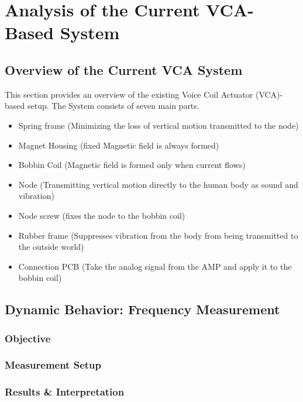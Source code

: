 \chapter{Analysis of the Current VCA-Based System}

\section{Overview of the Current VCA System}
This section provides an overview of the existing Voice Coil Actuator (VCA)-based setup. The System consists of seven main parts. 

\begin{itemize}
    \item Spring frame (Minimizing the loss of vertical motion transmitted to the node)
    \item Magnet Housing (fixed Magnetic field is always formed)
    \item Bobbin Coil (Magnetic field is formed only when current flows)
    \item Node (Transmitting vertical motion directly to the human body as sound and vibration)
    \item Node screw (fixes the node to the bobbin coil)
    \item Rubber frame (Suppresses vibration from the body from being transmitted to the outside world)
    \item Connection PCB (Take the analog signal from the AMP and apply it to the bobbin coil)
\end{itemize}

\section{Dynamic Behavior: Frequency Measurement}

\subsection{Objective}

\subsection{Measurement Setup}


\subsection{Results \& Interpretation}


